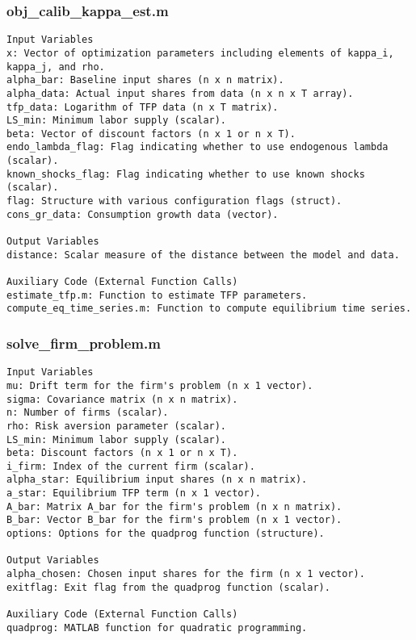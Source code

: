 \documentclass[11pt]{article}
\theoremstyle{definition}
\newcommand{\codepath}{F:/12004835/replication_package_final/replication_package_final}
\begin{document}
	
	
	\subsubsection{obj\_calib\_kappa\_est.m}
	\begin{lstlisting}[style=Matlab]
Input Variables
x: Vector of optimization parameters including elements of kappa_i, kappa_j, and rho.
alpha_bar: Baseline input shares (n x n matrix).
alpha_data: Actual input shares from data (n x n x T array).
tfp_data: Logarithm of TFP data (n x T matrix).
LS_min: Minimum labor supply (scalar).
beta: Vector of discount factors (n x 1 or n x T).
endo_lambda_flag: Flag indicating whether to use endogenous lambda (scalar).
known_shocks_flag: Flag indicating whether to use known shocks (scalar).
flag: Structure with various configuration flags (struct).
cons_gr_data: Consumption growth data (vector).

Output Variables
distance: Scalar measure of the distance between the model and data.

Auxiliary Code (External Function Calls)
estimate_tfp.m: Function to estimate TFP parameters.
compute_eq_time_series.m: Function to compute equilibrium time series.
	\end{lstlisting}
	
	
	
	
	
	\subsubsection{solve\_firm\_problem.m}
	\begin{lstlisting}[style=Matlab]
Input Variables
mu: Drift term for the firm's problem (n x 1 vector).
sigma: Covariance matrix (n x n matrix).
n: Number of firms (scalar).
rho: Risk aversion parameter (scalar).
LS_min: Minimum labor supply (scalar).
beta: Discount factors (n x 1 or n x T).
i_firm: Index of the current firm (scalar).
alpha_star: Equilibrium input shares (n x n matrix).
a_star: Equilibrium TFP term (n x 1 vector).
A_bar: Matrix A_bar for the firm's problem (n x n matrix).
B_bar: Vector B_bar for the firm's problem (n x 1 vector).
options: Options for the quadprog function (structure).

Output Variables
alpha_chosen: Chosen input shares for the firm (n x 1 vector).
exitflag: Exit flag from the quadprog function (scalar).

Auxiliary Code (External Function Calls)
quadprog: MATLAB function for quadratic programming.
	\end{lstlisting}
	
	
	
\end{document}

